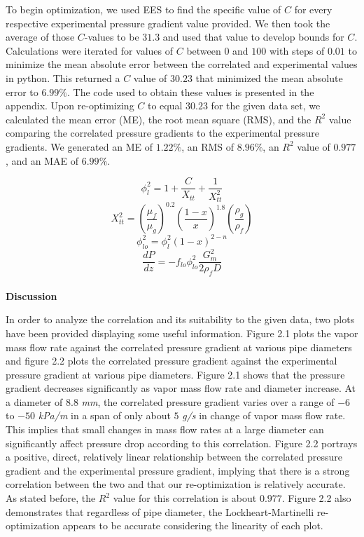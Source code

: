 To begin optimization, we used EES to find the specific value of \(C\) for every respective experimental pressure gradient value provided. We then took the average of those \(C\)-values to be \(31.3\) and used that value to develop bounds for \(C\). Calculations were iterated for values of \(C\) between \(0\) and \(100\) with steps of \(0.01\) to minimize the mean absolute error between the correlated and experimental values in python. This returned a \(C\) value of \(30.23\) that minimized the mean absolute error to \(6.99\%\). The code used to obtain these values is presented in the appendix. 
Upon re-optimizing \(C\) to equal \(30.23\) for the given data set, we calculated the mean error (ME), the root mean square (RMS), and the \(R^2\) value comparing the correlated pressure gradients to the experimental pressure gradients. We generated an ME of \(1.22\%\), an RMS of \(8.96\%\), an \(R^2\) value of \(0.977\), and an MAE of \(6.99\%\).

\begin{equation}
\phi_l^2=1+\frac{C}{X_{tt}}+\frac{1}{X_{tt}^2}
\end{equation}
\begin{equation}
X_{tt}^2=(\frac{\mu_f}{\mu_g})^{0.2}(\frac{1-x}{x})^{1.8}(\frac{\rho_g}{\rho_f})
\end{equation}
\begin{equation}
\phi_{lo}^2=\phi_l^2(1-x)^{2-n}
\end{equation}
\begin{equation}
\frac{dP}{dz}=-f_{lo}\phi_{lo}^2\frac{G_m^2}{2\rho_fD}
\end{equation}
\\
\textbf{Discussion}

In order to analyze the correlation and its suitability to the given data, two plots have been provided displaying some useful information. Figure 2.1 plots the vapor mass flow rate against the correlated pressure gradient at various pipe diameters and figure 2.2 plots the correlated pressure gradient against the experimental pressure gradient at various pipe diameters. Figure 2.1 shows that the pressure gradient decreases significantly as vapor mass flow rate and diameter increase. At a diameter of \(8.8\) \textit{mm}, the correlated pressure gradient varies over a range of \(-6\) to \(-50\) \textit{kPa/m} in a span of only about \(5\) \textit{g/s} in change of vapor mass flow rate. This implies that small changes in mass flow rates at a large diameter can significantly affect pressure drop according to this correlation. Figure 2.2 portrays a positive, direct, relatively linear relationship between the correlated pressure gradient and the experimental pressure gradient, implying that there is a strong correlation between the two and that our re-optimization is relatively accurate. As stated before, the \(R^2\) value for this correlation is about \(0.977\). Figure 2.2 also demonstrates that regardless of pipe diameter, the Lockheart-Martinelli re-optimization appears to be accurate considering the linearity of each plot.

